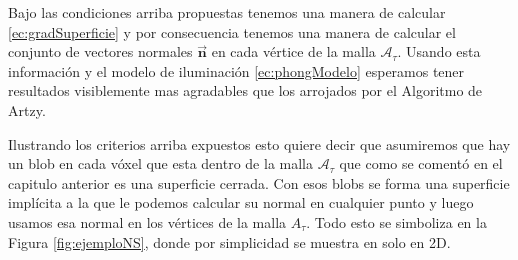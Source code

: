Bajo las condiciones arriba propuestas tenemos una manera de calcular \eqref{ec:gradSuperficie} y por consecuencia tenemos una manera de calcular el conjunto de vectores normales $\vec{\textbf{n}}$ en cada vértice de la malla $\mathcal{A}_{\tau}$. Usando esta información y el modelo de iluminación \eqref{ec:phongModelo} esperamos tener resultados visiblemente mas agradables que los arrojados por el Algoritmo de Artzy.

Ilustrando los criterios arriba expuestos esto quiere decir que asumiremos que hay un blob en cada vóxel que esta dentro de la malla $\mathcal{A}_{\tau}$ que como se comentó en el capitulo anterior es una superficie cerrada. Con esos blobs se forma una superficie implícita a la que le podemos calcular su normal en cualquier punto y luego usamos esa normal en los vértices de la malla $A_{\tau}$. Todo esto se simboliza en la Figura \ref{fig:ejemploNS}, donde por simplicidad se muestra en solo en 2D.

